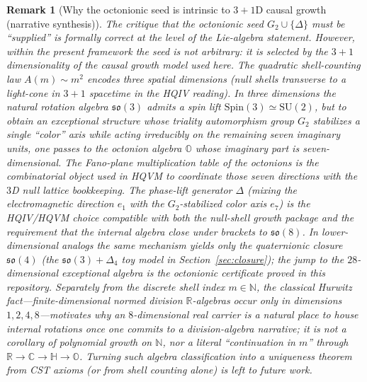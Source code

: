 \documentclass[11pt]{amsart}
\newtheorem{remark}[theorem]{Remark}
\begin{document}
\begin{remark}[Why the octonionic seed is intrinsic to \(3{+}1\)D causal growth (narrative synthesis)]
The critique that the octonionic seed \(G_2 \cup \{\Delta\}\) must be ``supplied'' is formally correct at the level of the Lie-algebra statement. However, within the present framework the seed is not arbitrary: it is selected by the \(3{+}1\) dimensionality of the causal growth model used here. The quadratic shell-counting law \(A(m) \sim m^2\) encodes three spatial dimensions (null shells transverse to a light-cone in \(3{+}1\) spacetime in the HQIV reading). In three dimensions the natural rotation algebra \(\mathfrak{so}(3)\) admits a spin lift \(\mathrm{Spin}(3) \simeq \mathrm{SU}(2)\), but to obtain an exceptional structure whose triality automorphism group \(G_2\) stabilizes a single ``color'' axis while acting irreducibly on the remaining seven imaginary units, one passes to the octonion algebra \(\mathbb{O}\) whose imaginary part is seven-dimensional. The Fano-plane multiplication table of the octonions is the combinatorial object used in HQVM to coordinate those seven directions with the \(3\)D null lattice bookkeeping. The phase-lift generator \(\Delta\) (mixing the electromagnetic direction \(e_1\) with the \(G_2\)-stabilized color axis \(e_7\)) is the HQIV/HQVM choice compatible with both the null-shell growth package and the requirement that the internal algebra close under brackets to \(\mathfrak{so}(8)\). In lower-dimensional analogs the same mechanism yields only the quaternionic closure \(\mathfrak{so}(4)\) (the \(\mathfrak{so}(3)+\Delta_4\) toy model in Section~\ref{sec:closure}); the jump to the \(28\)-dimensional exceptional algebra is the octonionic certificate proved in this repository. Separately from the discrete shell index \(m\in\mathbb{N}\), the classical Hurwitz fact---finite-dimensional normed division \(\mathbb{R}\)-algebras occur only in dimensions \(1,2,4,8\)---motivates why an \(8\)-dimensional real carrier is a natural place to house internal rotations once one commits to a division-algebra narrative; it is \emph{not} a corollary of polynomial growth on \(\mathbb{N}\), nor a literal ``continuation in \(m\)'' through \(\mathbb{R}\to\mathbb{C}\to\mathbb{H}\to\mathbb{O}\). Turning such algebra classification into a uniqueness theorem from CST axioms (or from shell counting alone) is left to future work.
\end{remark}
\end{document}
